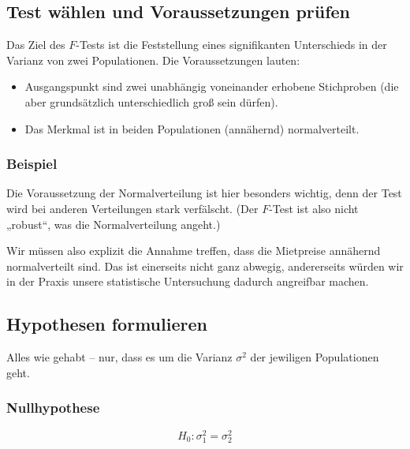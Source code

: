 \documentclass[
  11pt,
  ngerman,
  a4paper,
]{report}
\providecommand{\tightlist}{%
  \setlength{\itemsep}{0pt}\setlength{\parskip}{0pt}}
\begin{document}
\hypertarget{test-wuxe4hlen-und-voraussetzungen-pruxfcfen-3}{%
\subsection{Test wählen und Voraussetzungen prüfen}\label{test-wuxe4hlen-und-voraussetzungen-pruxfcfen-3}}

Das Ziel des \(F\)-Tests ist die Feststellung eines signifikanten Unterschieds in der Varianz von zwei Populationen. Die Voraussetzungen lauten:

\begin{itemize}
\tightlist
\item
  Ausgangspunkt sind zwei unabhängig voneinander erhobene Stichproben (die aber grundsätzlich unterschiedlich groß sein dürfen).
\item
  Das Merkmal ist in beiden Populationen (annähernd) normalverteilt.
\end{itemize}

\hypertarget{beispiel-17}{%
\subsubsection{Beispiel}\label{beispiel-17}}

Die Voraussetzung der Normalverteilung ist hier besonders wichtig, denn der Test wird bei anderen Verteilungen stark verfälscht. (Der \(F\)-Test ist also nicht „robust``, was die Normalverteilung angeht.)

Wir müssen also explizit die Annahme treffen, dass die Mietpreise annähernd normalverteilt sind. Das ist einerseits nicht ganz abwegig, andererseits würden wir in der Praxis unsere statistische Untersuchung dadurch angreifbar machen.

\hypertarget{hypothesen-formulieren-3}{%
\subsection{Hypothesen formulieren}\label{hypothesen-formulieren-3}}

Alles wie gehabt -- nur, dass es um die Varianz \(\sigma^2\) der jewiligen Populationen geht.

\hypertarget{nullhypothese-3}{%
\subsubsection{Nullhypothese}\label{nullhypothese-3}}

\[
H_0: \sigma^2_1=\sigma^2_2
\label{eq:h0f}
\]
\end{document}
